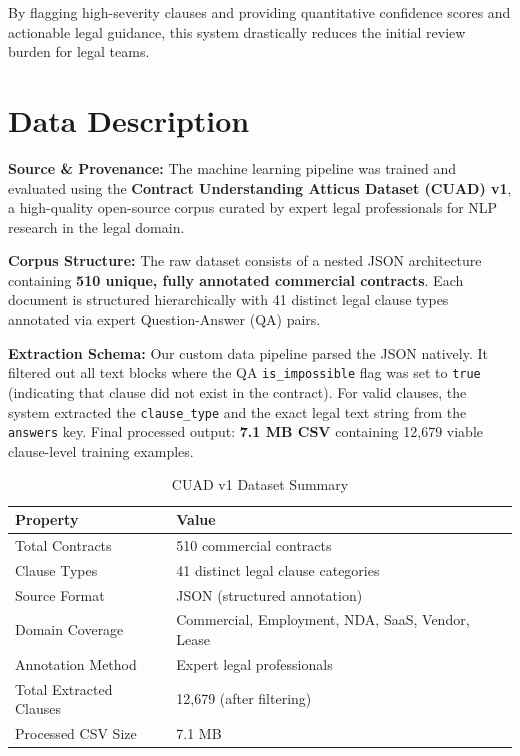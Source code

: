 \documentclass[12pt,a4paper]{article}
\begin{document}
By flagging high-severity clauses and providing quantitative confidence scores and
actionable legal guidance, this system drastically reduces the initial review burden
for legal teams.

\section{Data Description}
\label{sec:data}

\textbf{Source \& Provenance:} The machine learning pipeline was trained and
evaluated using the \textbf{Contract Understanding Atticus Dataset (CUAD) v1}, a
high-quality open-source corpus curated by expert legal professionals for NLP
research in the legal domain.

\vspace{0.2cm}
\noindent\textbf{Corpus Structure:} The raw dataset consists of a nested JSON
architecture containing \textbf{510 unique, fully annotated commercial contracts}.
Each document is structured hierarchically with 41 distinct legal clause types
annotated via expert Question-Answer (QA) pairs.

\vspace{0.2cm}
\noindent\textbf{Extraction Schema:} Our custom data pipeline parsed the JSON
natively. It filtered out all text blocks where the QA \texttt{is\_impossible} flag
was set to \texttt{true} (indicating that clause did not exist in the contract). For
valid clauses, the system extracted the \texttt{clause\_type} and the exact legal
text string from the \texttt{answers} key. Final processed output: \textbf{7.1 MB CSV}
containing 12,679 viable clause-level training examples.

\begin{table}[h]
\centering
\begin{tabular}{@{}ll@{}}
\toprule
\textbf{Property} & \textbf{Value} \\
\midrule
Total Contracts & 510 commercial contracts \\
Clause Types & 41 distinct legal clause categories \\
Source Format & JSON (structured annotation) \\
Domain Coverage & Commercial, Employment, NDA, SaaS, Vendor, Lease \\
Annotation Method & Expert legal professionals \\
Total Extracted Clauses & 12,679 (after filtering) \\
Processed CSV Size & 7.1 MB \\
\bottomrule
\end{tabular}
\caption{CUAD v1 Dataset Summary}
\end{table}
\end{document}
